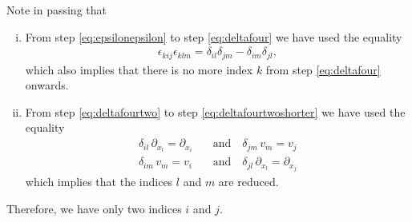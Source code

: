 \documentclass[12pt]{article}
\begin{document}
\begin{mdframed}
	Note in passing that 
	\begin{enumerate}[(i)]
		\item From step \eqref{eq:epsilonepsilon} to step \eqref{eq:deltafour} we have used the equality
		      \begin{align}
			      \epsilon_{kij}\epsilon_{klm} = \delta_{il}\delta_{jm} - \delta_{im}\delta_{jl},
		      \end{align}
		      which also implies that there is no more index $k$ from step \eqref{eq:deltafour} onwards.
		      
		\item From step \eqref{eq:deltafourtwo} to step \eqref{eq:deltafourtwoshorter} we have used the equality
		      \begin{align}
			      \delta_{il}\, \partial_{x_l} = \partial_{x_i} \quad & \text{and} \quad 
			      \delta_{jm}\, v_m            = v_j                                      \\
			      \delta_{im}\, v_m            = v_i            \quad & \text{and} \quad 
			      \delta_{jl}\, \partial_{x_l} = \partial_{x_j}
		      \end{align}
		      which implies that the indices $l$ and $m$ are reduced.
	\end{enumerate}
	Therefore, we have only two indices $i$ and $j$.
\end{mdframed}


% 
\end{document}
